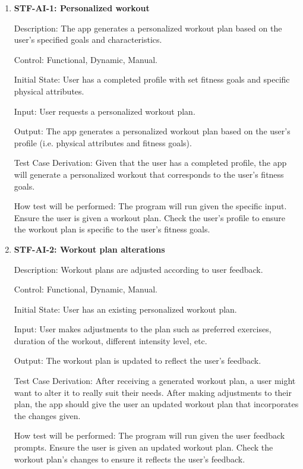 \documentclass[12pt, titlepage]{article}
\begin{document}
    \begin{enumerate}

        \item{\textbf{STF-AI-1: Personalized workout}\\}

        Description: The app generates a personalized workout plan based on the user’s specified goals and characteristics.

        Control: Functional, Dynamic, Manual.

        Initial State: User has a completed profile with set fitness goals and specific physical attributes.

        Input: User requests a personalized workout plan.

        Output: The app generates a personalized workout plan based on the user’s profile (i.e. physical attributes and fitness goals).

        Test Case Derivation: Given that the user has a completed profile, the app will generate a personalized workout that corresponds to the user’s fitness goals.

        How test will be performed: The program will run given the specific input. Ensure the user is given a workout plan. Check the user’s profile to ensure the workout plan is specific to the user’s fitness goals.

        \item{\textbf{STF-AI-2: Workout plan alterations}\\}

        Description: Workout plans are adjusted according to user feedback.

        Control: Functional, Dynamic, Manual.

        Initial State: User has an existing personalized workout plan.

        Input: User makes adjustments to the plan such as preferred exercises, duration of the workout, different intensity level, etc.

        Output: The workout plan is updated to reflect the user’s feedback.

        Test Case Derivation: After receiving a generated workout plan, a user might want to alter it to really suit their needs. After making adjustments to their plan, the app should give the user an updated workout plan that incorporates the changes given.

        How test will be performed: The program will run given the user feedback prompts. Ensure the user is given an updated workout plan. Check the workout plan’s changes to ensure it reflects the user’s feedback.


\end{enumerate}
\end{document}
